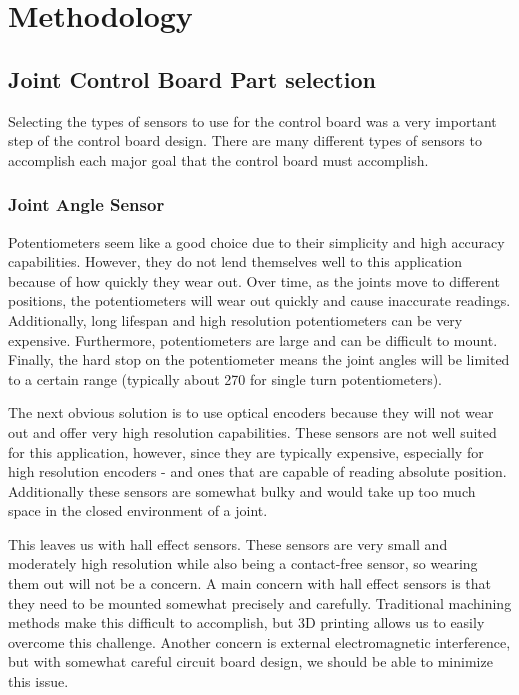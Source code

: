 \section{Methodology}

\subsection{Joint Control Board Part selection}
Selecting the types of sensors to use for the control board was a very important step of the control board design. There are many different types of sensors to accomplish each major goal that the control board must accomplish.

\subsubsection{Joint Angle Sensor}
Potentiometers seem like a good choice due to their simplicity and high accuracy capabilities. However, they do not lend themselves well to this application because of how quickly they wear out. Over time, as the joints move to different positions, the potentiometers will wear out quickly and cause inaccurate readings. Additionally, long lifespan and high resolution potentiometers can be very expensive. Furthermore, potentiometers are large and can be difficult to mount. Finally, the hard stop on the potentiometer means the joint angles will be limited to a certain range (typically about 270 \textdegree for single turn potentiometers).

\noindent The next obvious solution is to use optical encoders because they will not wear out and offer very high resolution capabilities. These sensors are not well suited for this application, however, since they are typically expensive, especially for high resolution encoders - and ones that are capable of reading absolute position. Additionally these sensors are somewhat bulky and would take up too much space in the closed environment of a joint. 

\noindent This leaves us with hall effect sensors. These sensors are very small and moderately high resolution while also being a contact-free sensor, so wearing them out will not be a concern. A main concern with hall effect sensors is that they need to be mounted somewhat precisely and carefully. Traditional machining methods make this difficult to accomplish, but 3D printing allows us to easily overcome this challenge.  Another concern is external electromagnetic interference, but with somewhat careful circuit board design, we should be able to minimize this issue.

